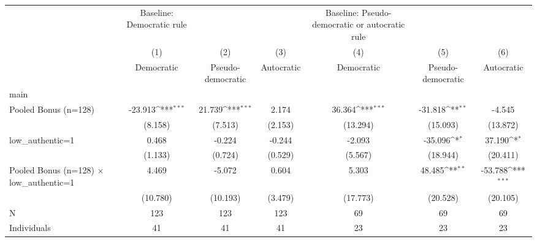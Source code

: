 {
\def\sym#1{\ifmmode^{#1}\else\(^{#1}\)\fi}
\begin{tabular}{l*{6}{c}}
\toprule
                    &Baseline: Democratic rule         &                     &                     &Baseline: Pseudo-democratic or autocratic rule         &                     &                     \\
                    &\multicolumn{1}{c}{(1)}&\multicolumn{1}{c}{(2)}&\multicolumn{1}{c}{(3)}&\multicolumn{1}{c}{(4)}&\multicolumn{1}{c}{(5)}&\multicolumn{1}{c}{(6)}\\
                    &\multicolumn{1}{c}{Democratic}&\multicolumn{1}{c}{Pseudo-democratic}&\multicolumn{1}{c}{Autocratic}&\multicolumn{1}{c}{Democratic}&\multicolumn{1}{c}{Pseudo-democratic}&\multicolumn{1}{c}{Autocratic}\\
\midrule
main                &                     &                     &                     &                     &                     &                     \\
Pooled Bonus (n=128)&     -23.913\sym{***}&      21.739\sym{***}&       2.174         &      36.364\sym{***}&     -31.818\sym{**} &      -4.545         \\
                    &     (8.158)         &     (7.513)         &     (2.153)         &    (13.294)         &    (15.093)         &    (13.872)         \\
\addlinespace
low\_authentic=1     &       0.468         &      -0.224         &      -0.244         &      -2.093         &     -35.096\sym{*}  &      37.190\sym{*}  \\
                    &     (1.133)         &     (0.724)         &     (0.529)         &     (5.567)         &    (18.944)         &    (20.411)         \\
\addlinespace
Pooled Bonus (n=128) $\times$ low\_authentic=1&       4.469         &      -5.072         &       0.604         &       5.303         &      48.485\sym{**} &     -53.788\sym{***}\\
                    &    (10.780)         &    (10.193)         &     (3.479)         &    (17.773)         &    (20.528)         &    (20.105)         \\
\midrule
N                   &         123         &         123         &         123         &          69         &          69         &          69         \\
Individuals         &          41         &          41         &          41         &          23         &          23         &          23         \\

\end{tabular}}
